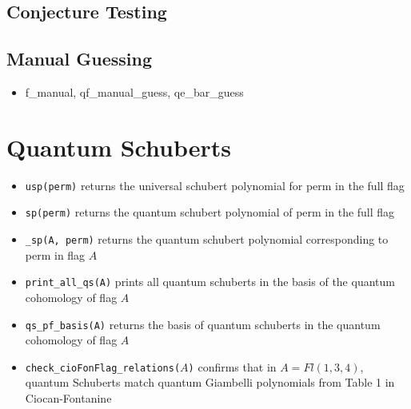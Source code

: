 \documentclass[11pt]{article}
\begin{document}
    \subsection{Conjecture Testing}
    
    \subsection{Manual Guessing}

    \begin{itemize}
        \item f\_manual, qf\_manual\_guess, qe\_bar\_guess
    \end{itemize}


\section{Quantum Schuberts}
\begin{itemize}
    \item \texttt{usp(perm)} returns the universal schubert polynomial for perm in the full flag
    \item \texttt{sp(perm)} returns the quantum schubert polynomial of perm in the full flag
    \item \texttt{\_sp(A, perm)} returns the quantum schubert polynomial corresponding to perm in flag $A$
    \item \texttt{print\_all\_qs(A)} prints all quantum schuberts in the basis of the quantum cohomology of flag $A$
    \item \texttt{qs\_pf\_basis(A)} returns the basis of quantum schuberts in the quantum cohomology of flag $A$
    \item \texttt{check\_cioFonFlag\_relations($A$)} confirms that in $A = Fl(1, 3, 4)$, quantum Schuberts match quantum Giambelli polynomials from Table 1 in Ciocan-Fontanine
\end{itemize}
\end{document}
